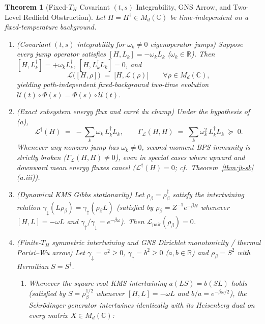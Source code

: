 \documentclass[11pt,a4paper]{article}
\newtheorem{theorem}{Theorem}
\theoremstyle{definition}
\theoremstyle{remark}
\newcommand{\cL}{\mathcal{L}}
\newcommand{\cU}{\mathcal{U}}
\newcommand{\bbC}{\mathbb{C}}
\newcommand{\bbR}{\mathbb{R}}
\newcommand{\1}{\mathbf{1}}
\begin{document}
\begin{theorem}[Fixed-$T_H$ Covariant $(t,s)$ Integrability, GNS Arrow, and Two-Level Redfield Obstruction]\label{thm:covariant-kms}
Let $H = H^\dagger \in M_d(\bbC)$ be time-independent on a fixed-temperature background.
\begin{enumerate}
  \item[(a)] \emph{(Covariant $(t,s)$ integrability for $\omega_k \neq 0$ eigenoperator jumps)} Suppose every jump operator satisfies $[H, L_k] = -\omega_k L_k$ ($\omega_k\in\bbR$). Then $[H, L_k^\dagger] = +\omega_k L_k^\dagger$, $[H, L_k^\dagger L_k] = 0$, and
  \begin{equation}\label{eq:cov-comm}
    \cL\bigl([H, \rho]\bigr) \;=\; \bigl[H, \cL(\rho)\bigr] \qquad \forall \rho \in M_d(\bbC),
  \end{equation}
  yielding path-independent fixed-background two-time evolution $\cU(t)\circ\Phi(s) = \Phi(s)\circ\cU(t)$.
  \item[(b)] \emph{(Exact subsystem energy flux and carr\'e du champ)} Under the hypothesis of (a),
  \begin{equation}\label{eq:eigen-flux-cdc}
    \cL^\dagger(H) \;=\; -\sum_k \omega_k\, L_k^\dagger L_k, \qquad
    \Gamma_{\cL}(H, H) \;=\; \sum_k \omega_k^2\, L_k^\dagger L_k \;\succeq\; 0.
  \end{equation}
  Whenever any nonzero jump has $\omega_k\neq 0$, second-moment BPS immunity is strictly broken ($\Gamma_\cL(H,H)\neq 0$), even in special cases where upward and downward mean energy fluxes cancel ($\cL^\dagger(H)=0$; cf.\ Theorem~\ref{thm:jt-sk}(a.iii)).
  \item[(c)] \emph{(Dynamical KMS Gibbs stationarity)} Let $\rho_\beta = \rho_\beta^\dagger$ satisfy the intertwining relation $\gamma_\downarrow (L \rho_\beta) = \gamma_\uparrow (\rho_\beta L)$ (satisfied by $\rho_\beta = Z^{-1} e^{-\beta H}$ whenever $[H, L] = -\omega L$ and $\gamma_\uparrow / \gamma_\downarrow = e^{-\beta\omega}$). Then $\cL_{\mathrm{pair}}(\rho_\beta) = 0$.
  \item[(d)] \emph{(Finite-$T_H$ symmetric intertwining and GNS Dirichlet monotonicity / thermal Parisi--Wu arrow)} Let $\gamma_\downarrow = a^2 \ge 0$, $\gamma_\uparrow = b^2 \ge 0$ ($a,b\in\bbR$) and $\rho_\beta = S^2$ with Hermitian $S = S^\dagger$.
  \begin{enumerate}
    \item[(i)] Whenever the square-root KMS intertwining $a(L S) = b(S L)$ holds (satisfied by $S=\rho_\beta^{1/2}$ whenever $[H,L]=-\omega L$ and $b/a = e^{-\beta\omega/2}$), the Schr\"odinger generator intertwines identically with its Heisenberg dual on \emph{every} matrix $X\in M_d(\bbC)$:

\end{enumerate}
\end{enumerate}
\end{theorem}
\end{document}
